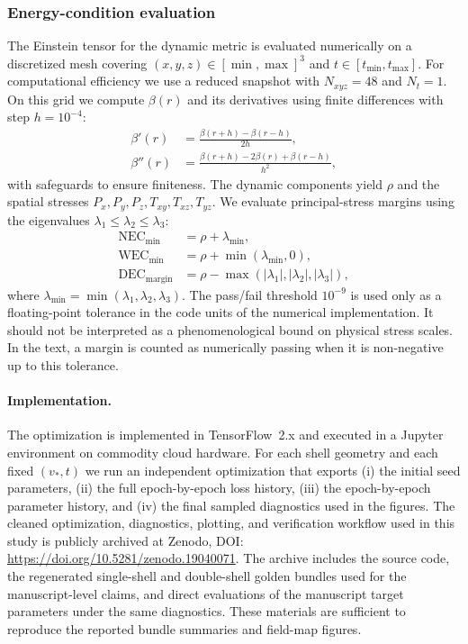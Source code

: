 \documentclass[11pt]{article}
\begin{document}
\subsubsection{Energy-condition evaluation}
The Einstein tensor for the dynamic metric is evaluated numerically on a discretized mesh covering $(x,y,z)\in[\min,\max]^3$ and $t\in[t_{\min},t_{\max}]$. For computational efficiency we use a reduced snapshot with $N_{xyz}=48$ and $N_t=1$. On this grid we compute $\beta(r)$ and its derivatives using finite differences with step $h=10^{-4}$:
\begin{align}
\beta'(r) &= \frac{\beta(r+h) - \beta(r-h)}{2h}, \\
\beta''(r) &= \frac{\beta(r+h) - 2\beta(r) + \beta(r-h)}{h^2},
\end{align}
with safeguards to ensure finiteness. The dynamic components yield $\rho$ and the spatial stresses $P_x,P_y,P_z,T_{xy},T_{xz},T_{yz}$. We evaluate principal-stress margins using the eigenvalues $\lambda_1\le\lambda_2\le\lambda_3$:
\begin{align}
\text{NEC}_{\min} &= \rho + \lambda_{\min}, \\
\text{WEC}_{\min} &= \rho + \min(\lambda_{\min}, 0), \\
\text{DEC}_{\text{margin}} &= \rho - \max(|\lambda_1|, |\lambda_2|, |\lambda_3|),
\end{align}
where $\lambda_{\min}=\min(\lambda_1,\lambda_2,\lambda_3)$. 
The pass/fail threshold $10^{-9}$ is used only as a floating-point tolerance in the code units of the numerical implementation. It should not be interpreted as a phenomenological bound on physical stress scales. In the text, a margin is counted as numerically passing when it is non-negative up to this tolerance.

\paragraph{Implementation.}

The optimization is implemented in TensorFlow~2.x and executed in a Jupyter environment on commodity cloud hardware. For each shell geometry and each fixed $(v_*,t)$ we run an independent optimization that exports (i) the initial seed parameters, (ii) the full epoch-by-epoch loss history, (iii) the epoch-by-epoch parameter history, and (iv) the final sampled diagnostics used in the figures. The cleaned optimization, diagnostics, plotting, and verification workflow used in this study is publicly archived at Zenodo, DOI: \url{https://doi.org/10.5281/zenodo.19040071}. The archive includes the source code, the regenerated single-shell and double-shell golden bundles used for the manuscript-level claims, and direct evaluations of the manuscript target parameters under the same diagnostics. These materials are sufficient to reproduce the reported bundle summaries and field-map figures.
\end{document}
